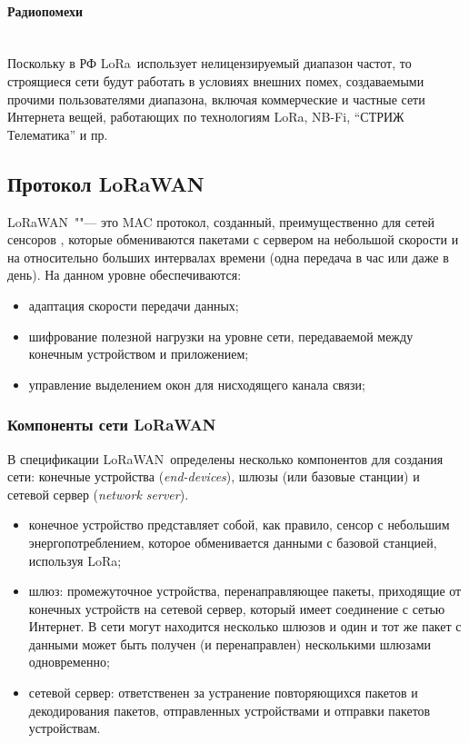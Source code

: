 \paragraph{Радиопомехи} \hspace{0pt}\\

Поскольку в РФ LoRa\texttrademark~использует нелицензируемый диапазон частот, 
то строящиеся 
сети будут работать в условиях внешних помех, создаваемыми прочими 
пользователями диапазона, включая коммерческие и частные сети Интернета вещей, 
работающих по технологиям LoRa\texttrademark, NB-Fi, ``СТРИЖ Телематика'' и пр.

\subsection{Протокол LoRaWAN\texttrademark}

LoRaWAN\texttrademark~""--- это MAC протокол, созданный, преимущественно для 
сетей сенсоров \cite{augustin2016, lavric2017internet}, которые обмениваются 
пакетами с сервером на небольшой скорости и на относительно больших интервалах 
времени (одна передача в час или даже в день).
На данном уровне обеспечиваются:
\begin{itemize}
 \item адаптация скорости передачи данных;
 \item шифрование полезной нагрузки на уровне сети, передаваемой между конечным 
устройством и приложением;
 \item управление выделением окон для нисходящего канала связи;
\end{itemize}


\subsubsection{Компоненты сети LoRaWAN\texttrademark}

В спецификации LoRaWAN\texttrademark~определены несколько компонентов для 
создания сети: конечные устройства (\textit{end-devices}), шлюзы (или базовые 
станции) и сетевой сервер (\textit{network server}).
\begin{itemize}
 \item конечное устройство представляет собой, как правило, сенсор с небольшим 
энергопотреблением, которое обменивается данными с базовой станцией, используя
LoRa\texttrademark;
 \item шлюз: промежуточное устройства, перенаправляющее пакеты, приходящие от 
конечных устройств на сетевой сервер, который имеет соединение с сетью 
Интернет. 
В сети могут находится несколько шлюзов и один и тот же пакет с данными может 
быть получен (и перенаправлен) несколькими шлюзами одновременно;
 \item сетевой сервер: ответственен за устранение повторяющихся пакетов и 
декодирования пакетов, отправленных устройствами и отправки пакетов устройствам.
\end{itemize}

